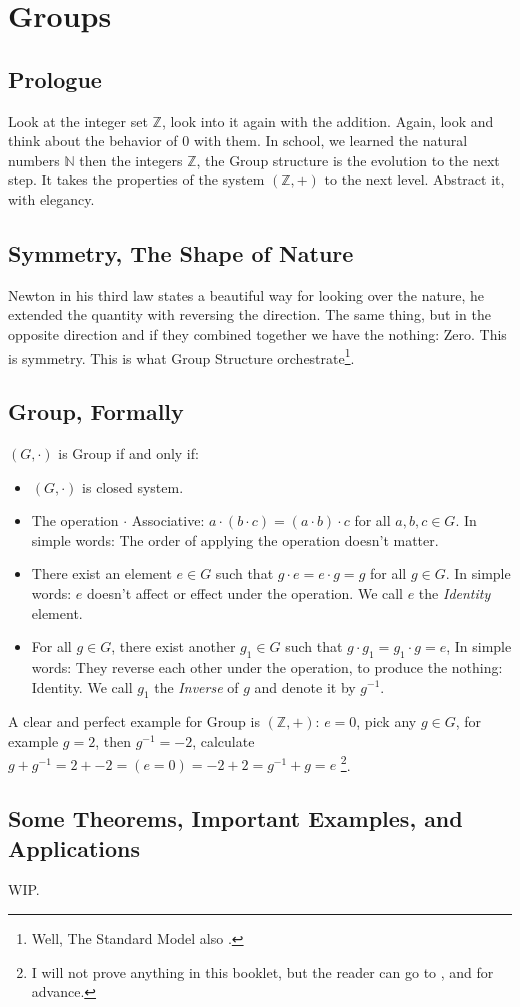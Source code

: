 \section{Groups \label{group}}
\subsection{Prologue}
Look at the integer set $\mathbb{Z}$, look into it again with the addition. Again, look and think about the behavior of $0$ with them. In school, we learned the natural numbers $\mathbb{N}$ then the integers $\mathbb{Z}$, the Group structure is the evolution to the next step. It takes the properties of the system $(\mathbb{Z},+)$ to the next level. Abstract it, with elegancy.

\subsection{Symmetry, The Shape of Nature}
Newton in his third law states a beautiful way for looking over the nature, he extended the quantity with reversing the direction. The same thing, but in the opposite direction and if they combined together we have the nothing: Zero. This is symmetry. This is what Group Structure orchestrate\footnote{Well, The Standard Model also \cite{enwiki:1038581383}.}.

\subsection{Group, Formally}

$(G,\cdot)$ is Group if and only if:
\begin{itemize}
   \item $(G,\cdot)$ is closed system.
   \item The operation $\cdot$ Associative: $a \cdot (b \cdot c) = (a \cdot b) \cdot c$ for all $a,b,c \in G$. In simple words: The order of applying the operation doesn't matter.
   \item There exist an element $e \in G$ such that $g \cdot e = e \cdot g = g$ for all $g \in G$. In simple words: $e$ doesn't affect or effect under the operation. We call $e$ the {\it Identity} element.
   \item For all $g \in G$, there exist another $g_1 \in G$ such that $g \cdot g_1 = g_1 \cdot g = e$, In simple words: They reverse each other under the operation, to produce the nothing: Identity. We call $g_1$ the {\it Inverse} of $g$ and denote it by $g^{-1}$.
\end{itemize}
A clear and perfect example for Group is $(\mathbb{Z},+)$: $e = 0$, pick any $g \in G$, for example $g = 2$, then $g^{-1}=-2$, calculate $g + g^{-1} = 2 + -2 = ( e = 0 ) = -2 + 2 = g^{-1} + g = e$ \footnote{I will not prove anything in this booklet, but the reader can go to  \cite{fraleigh2003a}, and \cite{beardon2005algebra} for advance.}.

\subsection{Some Theorems, Important Examples, and Applications}
WIP.